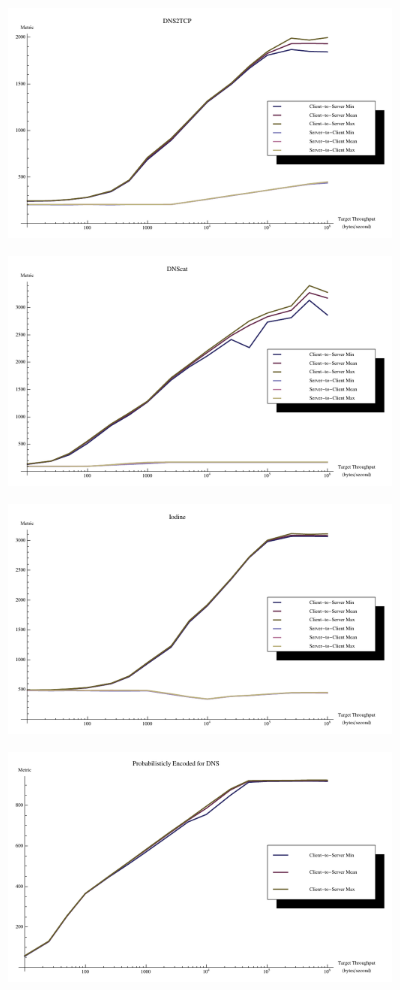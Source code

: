 \documentclass[12pt]{report}
\theoremstyle{remark}
\theoremstyle{definition}
\theoremstyle{definition}
\theoremstyle{definition}
\begin{document}
\begin{figure}
\centering
\includegraphics[width=4in]{figures/metric-tun-dns2tcp.pdf}
\end{figure}
\begin{figure}
\centering
\includegraphics[width=4in]{figures/metric-tun-dnscat.pdf}
\end{figure}
\begin{figure}
\centering
\includegraphics[width=4in]{figures/metric-tun-iodine.pdf}
\end{figure}
\begin{figure}
\centering
\includegraphics[width=4in]{figures/metric-tun-probdns.pdf}
\end{figure}
\end{document}
